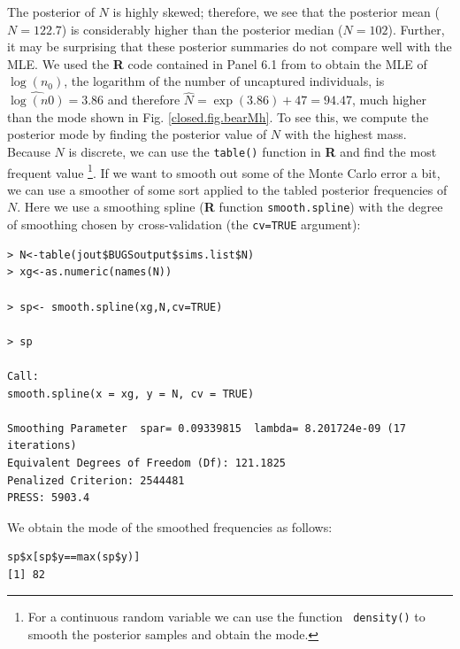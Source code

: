 The posterior of $N$ is highly skewed; therefore, we see that the
posterior mean
($N=122.7$) is considerably higher than the posterior median
($N=102$).
Further, it may be surprising that these posterior
summaries do not compare well with the MLE.
We used
the {\bf R} code contained in Panel 6.1 from
\citet{royle_dorazio:2008} to obtain the
MLE of $\log(n_{0})$, the logarithm of the number of uncaptured
individuals, is $\widehat{\log(n0)} = 3.86$ and therefore $\hat{N} =
\exp(3.86)+47 = 94.47$, much higher than the mode
shown in Fig. \ref{closed.fig.bearMh}.
To see this, we compute the posterior mode by finding
the posterior value of $N$ with the highest mass.
 Because $N$ is discrete, we can  use
the \mbox{\tt table()} function in {\bf R} and find the most frequent value
\footnote{For a continuous random variable we can use the function
 \mbox{\tt
    density()} to smooth the posterior samples and obtain the mode.}.
If we want to smooth out some of the Monte
Carlo error a bit, we can use a smoother of some sort applied to the tabled
posterior frequencies of $N$. Here we use a smoothing spline ({\bf R}
function \mbox{\tt smooth.spline}) with the
degree of smoothing chosen by cross-validation (the \mbox{\tt cv=TRUE}
argument):
{\small
\begin{verbatim}
> N<-table(jout$BUGSoutput$sims.list$N)
> xg<-as.numeric(names(N))

> sp<- smooth.spline(xg,N,cv=TRUE)

> sp

Call:
smooth.spline(x = xg, y = N, cv = TRUE)

Smoothing Parameter  spar= 0.09339815  lambda= 8.201724e-09 (17 iterations)
Equivalent Degrees of Freedom (Df): 121.1825
Penalized Criterion: 2544481
PRESS: 5903.4
\end{verbatim}
}
We obtain the mode of the smoothed frequencies as follows:
\begin{verbatim}
sp$x[sp$y==max(sp$y)]
[1] 82
\end{verbatim}


